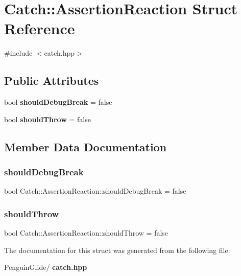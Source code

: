 \section{Catch\+::Assertion\+Reaction Struct Reference}
\label{struct_catch_1_1_assertion_reaction}


{\ttfamily \#include $<$catch.\+hpp$>$}

\subsection*{Public Attributes}
\begin{DoxyCompactItemize}
\item 
bool \textbf{ should\+Debug\+Break} = false
\item 
bool \textbf{ should\+Throw} = false
\end{DoxyCompactItemize}


\subsection{Member Data Documentation}
\mbox{\label{struct_catch_1_1_assertion_reaction_adcf30fb90ff20d9789df78d424652497}} 
\subsubsection{shouldDebugBreak}
{\footnotesize\ttfamily bool Catch\+::\+Assertion\+Reaction\+::should\+Debug\+Break = false}

\mbox{\label{struct_catch_1_1_assertion_reaction_a82c8d95a2c1b6a331bde66982a8e090f}} 
\subsubsection{shouldThrow}
{\footnotesize\ttfamily bool Catch\+::\+Assertion\+Reaction\+::should\+Throw = false}



The documentation for this struct was generated from the following file\+:\begin{DoxyCompactItemize}
\item 
Penguin\+Glide/\textbf{ catch.\+hpp}\end{DoxyCompactItemize}
